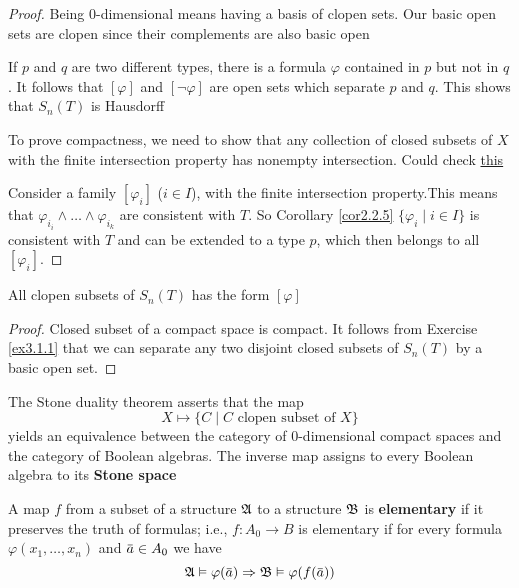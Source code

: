 \documentclass[11pt]{article}
\begin{document}
\begin{proof}
Being 0-dimensional means having a basis of clopen sets. Our basic open sets
are clopen since their complements are also basic open

If \(p\) and \(q\) are two different types, there is a formula \(\varphi\) contained in
\(p\) but not in \(q\). It follows that \([\varphi]\) and \([\neg\varphi]\) are
open sets which separate \(p\) and \(q\). This shows that \(S_n(T)\) is
Hausdorff

To prove compactness, we need to show that any collection of closed subsets
of \(X\) with the finite intersection property has nonempty intersection.
Could check  \href{http://www.msc.uky.edu/droyster/courses/fall99/math4181/classnotes/notes5.pdf}{this}

Consider a family \([\varphi_i]\) (\(i\in I\)), with the finite intersection property.This
means that \(\varphi_{i_i}\wedge\dots\wedge\varphi_{i_k}\) are consistent
with \(T\). So Corollary \ref{cor2.2.5} \(\{\varphi_i\mid i\in I\}\) is
consistent with \(T\) and can be extended to a type \(p\), which then belongs
to all \([\varphi_i]\).  
\end{proof}

\begin{lemma}[]
All clopen subsets of \(S_n(T)\) has the form \([\varphi]\)
\end{lemma}

\begin{proof}
Closed subset of a compact space is compact. It follows from Exercise \ref{ex3.1.1} that we can
separate any two disjoint
closed subsets of \(S_n(T)\) by a basic open set.
\end{proof}

The Stone duality theorem asserts that the map
\begin{equation*}
X\mapsto\{C\mid C\text{ clopen subset of }X\}
\end{equation*}
yields an equivalence between the category of 0-dimensional compact spaces
and the category of Boolean algebras. The inverse map assigns to every
Boolean algebra to its \textbf{Stone space}

\begin{definition}[]


A map \(f\) from a subset of a structure \(\mathfrak{A}\) to a structure \(\mathfrak{B}\) is
\textbf{elementary} if it preserves the truth of formulas; i.e., \(f:A_0\to B\) is
elementary if for every formula \(\varphi(x_1,\dots,x_n)\) and \(\bbar{a}\in A_0\)
we have
\begin{equation*}
\fA\vDash\varphi(\bbar{a})\Rightarrow\fB\vDash\varphi(f(\bbar{a}))
\end{equation*}
\end{definition}
\end{document}
